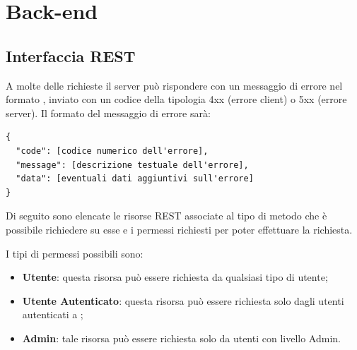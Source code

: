 \section{Back-end}

\subsection{Interfaccia REST}

A molte delle richieste il server può rispondere con un messaggio di errore nel formato , inviato con un codice  della tipologia 4xx (errore client) o 5xx (errore server). 
Il formato  del messaggio di errore sarà:

\begin{lstlisting}
{ 
  "code": [codice numerico dell'errore],
  "message": [descrizione testuale dell'errore],
  "data": [eventuali dati aggiuntivi sull'errore]
}
\end{lstlisting}

Di seguito sono elencate le risorse REST associate al tipo di metodo che è possibile richiedere su esse e i permessi richiesti per poter effettuare la richiesta.

I tipi di permessi possibili sono: 
\begin{itemize}
\item \textbf{Utente}: questa risorsa può essere richiesta da qualsiasi tipo di utente;
\item \textbf{Utente Autenticato}: questa risorsa può essere richiesta solo dagli utenti autenticati a ;
\item \textbf{Admin}: tale risorsa può essere richiesta solo da utenti con livello Admin.
\end{itemize}

